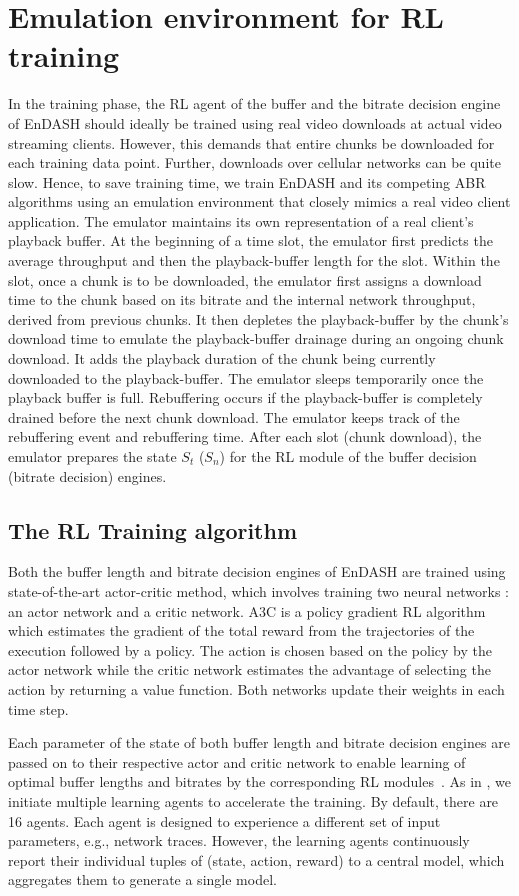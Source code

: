 \section{Emulation environment for \ac{RL} training}
In the training phase, the \ac{RL} agent of the buffer and the bitrate decision engine of EnDASH should ideally be trained using real video downloads at actual video streaming clients. 
However, this demands that entire chunks be downloaded for each training data point. Further, downloads over cellular networks can be quite slow. Hence, to save training time, we train EnDASH and its competing  ABR algorithms using an emulation environment that closely mimics a real video client application. The emulator maintains its own representation of a real client's playback buffer. At the beginning of a time slot, the emulator first predicts the average throughput and then the playback-buffer length for the slot. Within the slot, once a chunk is to be downloaded, the emulator first assigns a download time to the chunk based  on its bitrate and the internal network throughput, derived from previous chunks. It then depletes the playback-buffer by the chunk's download time to emulate the playback-buffer drainage during an ongoing chunk download. It adds the playback duration of the  chunk being currently downloaded to the playback-buffer. The emulator sleeps temporarily once the playback buffer is full. Rebuffering occurs if the playback-buffer is completely drained before the next chunk download. The emulator keeps track of the rebuffering event and rebuffering time. After each slot (chunk download), the emulator prepares the state $S_t$ ($S_n$) for the \ac{RL} module of the buffer decision (bitrate decision) engines.
\subsection{The \ac{RL} Training algorithm}
Both the buffer length and bitrate decision engines of EnDASH are trained using  state-of-the-art actor-critic method, which involves training two neural networks \cite{mao2017neural}: an actor network and a critic network. A3C is a policy gradient \ac{RL} algorithm which estimates the gradient of the total reward from the trajectories of the execution followed by a policy. The action is chosen based on the policy by the actor network while the critic network estimates the advantage of selecting the action by returning a value function. Both networks update their weights in each time step.
 
\indent Each parameter of the state  of both buffer length and bitrate decision engines are passed on to their respective actor and critic network to enable learning of optimal buffer lengths and bitrates by the corresponding \ac{RL} modules~\cite{mao2017neural}.
As in \cite{mao2017neural}, we initiate multiple learning agents to accelerate the training. By default, there are 16 agents. Each agent is designed to experience a different set of input parameters, e.g., network traces. However, the learning agents continuously report  their individual tuples of (state, action, reward)  to a central model, which aggregates them to generate a single model.
